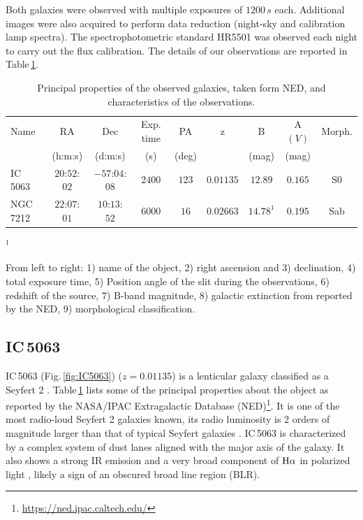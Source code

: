 \documentclass[../main.tex]{subfiles}
\begin{document}
Both galaxies were observed with multiple exposures of $1200\,\si{s}$ each.
Additional images were also acquired to perform data reduction (night-sky and calibration lamp spectra).
The spectrophotometric standard HR5501 was observed each night to carry out the flux calibration.
The details of our observations are reported in Table\,\ref{tab:obs}. 


\begin{table}
\caption[]{Principal properties of the observed galaxies, taken form NED, and characteristics of the observations.}
\label{tab:obs}
\centering
\footnotesize
\begin{threeparttable}
\begin{tabular}{lcccccccc}
\hline
Name&RA&Dec& Exp. time & PA & z& B & A$(V)$& Morph.\\
&(h:m:s)&(d:m:s)& (s)& (deg)& & (mag)&(mag)&\\
\hline
IC\,5063& $20$:$52$:$02$&$-57$:$04$:$08$&$2400$&$123$&$0.01135$&$12.89$ &$0.165$&S0\\
NGC\,7212&$22$:$07$:$01$&$10$:$13$:$52$&$6000$&$16$&$0.02663$& $14.78^1$& $0.195$&Sab\\
\hline
\end{tabular}
\small
\begin{tablenotes}
\item $^1$\cite{Munoz07}
\item From left to right: 1) name of the object, 2) right ascension and 3) declination, 4) total exposure time, 5) Position angle of the slit during the observations, 6) redshift of the source, 7) B-band magnitude, 8) galactic extinction from \citet{Schlafly11} reported by the NED, 9) morphological classification.
\end{tablenotes}
\end{threeparttable}
\normalsize
\end{table}


\subsection{IC\,5063}
\label{sec:IC5063}




IC\,5063 (Fig.\,\ref{fig:IC5063}) ($z=0.01135$) is a lenticular galaxy classified as a Seyfert 2 \citep{Morganti07}.
Table\,\ref{tab:obs} lists some of the principal properties about the object as reported by the NASA/IPAC Extragalactic Database (NED)\footnote{\url{https://ned.ipac.caltech.edu/}}.
It is one of the most radio-loud Seyfert 2 galaxies known, its radio luminosity is 2 orders of magnitude larger than that of typical Seyfert galaxies \citep{Morganti98}.
IC\,5063 is characterized by a complex system of dust lanes aligned with the major axis of the galaxy.
It also shows a strong IR emission \citep{Hough87} and a very broad component of $\rm H\alpha$ in polarized light \citep{Inglis93}, likely a sign of an obscured broad line region (BLR).
\end{document}

